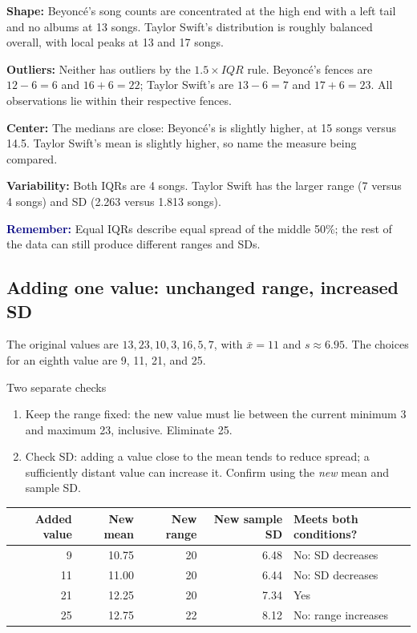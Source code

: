 \documentclass[11pt]{article}
\newcommand{\key}[1]{\textbf{\textcolor{Navy}{#1}}}
\begin{document}
\begin{answerbox}
\textbf{Shape:} Beyonc\'e's song counts are concentrated at the high end with a left tail and no albums at 13 songs. Taylor Swift's distribution is roughly balanced overall, with local peaks at 13 and 17 songs.

\textbf{Outliers:} Neither has outliers by the $1.5\times IQR$ rule. Beyonc\'e's fences are $12-6=6$ and $16+6=22$; Taylor Swift's are $13-6=7$ and $17+6=23$. All observations lie within their respective fences.

\textbf{Center:} The medians are close: Beyonc\'e's is slightly higher, at 15 songs versus 14.5. Taylor Swift's mean is slightly higher, so name the measure being compared.

\textbf{Variability:} Both IQRs are 4 songs. Taylor Swift has the larger range (7 versus 4 songs) and SD (2.263 versus 1.813 songs).
\end{answerbox}

\key{Remember:} Equal IQRs describe equal spread of the middle 50\%; the rest of the data can still produce different ranges and SDs.

\clearpage
\subsection{Adding one value: unchanged range, increased SD}
\label{review:add}

The original values are $13,23,10,3,16,5,7$, with $\bar{x}=11$ and $s\approx6.95$. The choices for an eighth value are 9, 11, 21, and 25.

\begin{bigidea}{Two separate checks}
\begin{enumerate}[label=\arabic*.]
  \item Keep the range fixed: the new value must lie between the current minimum 3 and maximum 23, inclusive. Eliminate 25.
  \item Check SD: adding a value close to the mean tends to reduce spread; a sufficiently distant value can increase it. Confirm using the \emph{new} mean and sample SD.
\end{enumerate}
\end{bigidea}

\begin{center}
\begin{tabular}{rrrrl}
\toprule
Added value & New mean & New range & New sample SD & Meets both conditions?\\
\midrule
9 & 10.75 & 20 & 6.48 & No: SD decreases\\
11 & 11.00 & 20 & 6.44 & No: SD decreases\\
21 & 12.25 & 20 & 7.34 & Yes\\
25 & 12.75 & 22 & 8.12 & No: range increases\\
\bottomrule
\end{tabular}
\end{center}
\end{document}
